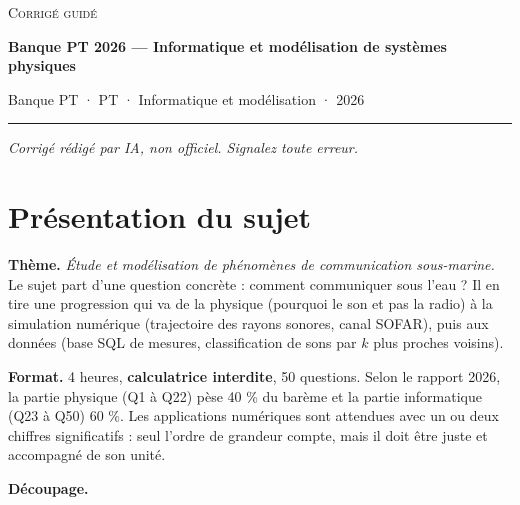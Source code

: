 \documentclass[11pt,a4paper]{article}
\begin{document}
\thispagestyle{plain}
\begin{center}
  {\small\scshape Corrigé guidé}\par\smallskip
  {\LARGE\bfseries Banque PT 2026 — Informatique et modélisation de systèmes physiques\par}\medskip
  {\large Banque PT · PT · Informatique et modélisation · 2026\par}
\end{center}
\vspace{2pt}\hrule\vspace{8pt}

\emph{Corrigé rédigé par IA, non officiel. Signalez toute erreur.}

\hypertarget{pruxe9sentation-du-sujet}{%
\section{Présentation du sujet}\label{pruxe9sentation-du-sujet}}

\textbf{Thème.} \emph{Étude et modélisation de phénomènes de communication sous-marine.} Le sujet part d'une question concrète : comment communiquer sous l'eau ? Il en tire une progression qui va de la physique (pourquoi le son et pas la radio) à la simulation numérique (trajectoire des rayons sonores, canal SOFAR), puis aux données (base SQL de mesures, classification de sons par \(k\) plus proches voisins).

\textbf{Format.} 4 heures, \textbf{calculatrice interdite}, 50 questions. Selon le rapport 2026, la partie physique (Q1 à Q22) pèse 40 \% du barème et la partie informatique (Q23 à Q50) 60 \%. Les applications numériques sont attendues avec un ou deux chiffres significatifs : seul l'ordre de grandeur compte, mais il doit être juste et accompagné de son unité.

\textbf{Découpage.}
\end{document}
